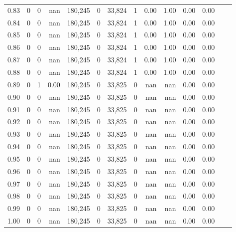 \begin{tabular}{rrrrrrrrrrrrrr}
0.83 &       0 &      0 &     nan &  180,245 &        0 &  33,824 &       1 &  0.00 &  1.00 &  0.00 &      0.00 \\
0.84 &       0 &      0 &     nan &  180,245 &        0 &  33,824 &       1 &  0.00 &  1.00 &  0.00 &      0.00 \\
0.85 &       0 &      0 &     nan &  180,245 &        0 &  33,824 &       1 &  0.00 &  1.00 &  0.00 &      0.00 \\
0.86 &       0 &      0 &     nan &  180,245 &        0 &  33,824 &       1 &  0.00 &  1.00 &  0.00 &      0.00 \\
0.87 &       0 &      0 &     nan &  180,245 &        0 &  33,824 &       1 &  0.00 &  1.00 &  0.00 &      0.00 \\
0.88 &       0 &      0 &     nan &  180,245 &        0 &  33,824 &       1 &  0.00 &  1.00 &  0.00 &      0.00 \\
0.89 &       0 &      1 &    0.00 &  180,245 &        0 &  33,825 &       0 &   nan &   nan &  0.00 &      0.00 \\
0.90 &       0 &      0 &     nan &  180,245 &        0 &  33,825 &       0 &   nan &   nan &  0.00 &      0.00 \\
0.91 &       0 &      0 &     nan &  180,245 &        0 &  33,825 &       0 &   nan &   nan &  0.00 &      0.00 \\
0.92 &       0 &      0 &     nan &  180,245 &        0 &  33,825 &       0 &   nan &   nan &  0.00 &      0.00 \\
0.93 &       0 &      0 &     nan &  180,245 &        0 &  33,825 &       0 &   nan &   nan &  0.00 &      0.00 \\
0.94 &       0 &      0 &     nan &  180,245 &        0 &  33,825 &       0 &   nan &   nan &  0.00 &      0.00 \\
0.95 &       0 &      0 &     nan &  180,245 &        0 &  33,825 &       0 &   nan &   nan &  0.00 &      0.00 \\
0.96 &       0 &      0 &     nan &  180,245 &        0 &  33,825 &       0 &   nan &   nan &  0.00 &      0.00 \\
0.97 &       0 &      0 &     nan &  180,245 &        0 &  33,825 &       0 &   nan &   nan &  0.00 &      0.00 \\
0.98 &       0 &      0 &     nan &  180,245 &        0 &  33,825 &       0 &   nan &   nan &  0.00 &      0.00 \\
0.99 &       0 &      0 &     nan &  180,245 &        0 &  33,825 &       0 &   nan &   nan &  0.00 &      0.00 \\
1.00 &       0 &      0 &     nan &  180,245 &        0 &  33,825 &       0 &   nan &   nan &  0.00 &      0.00 \\
\bottomrule
\end{tabular}
